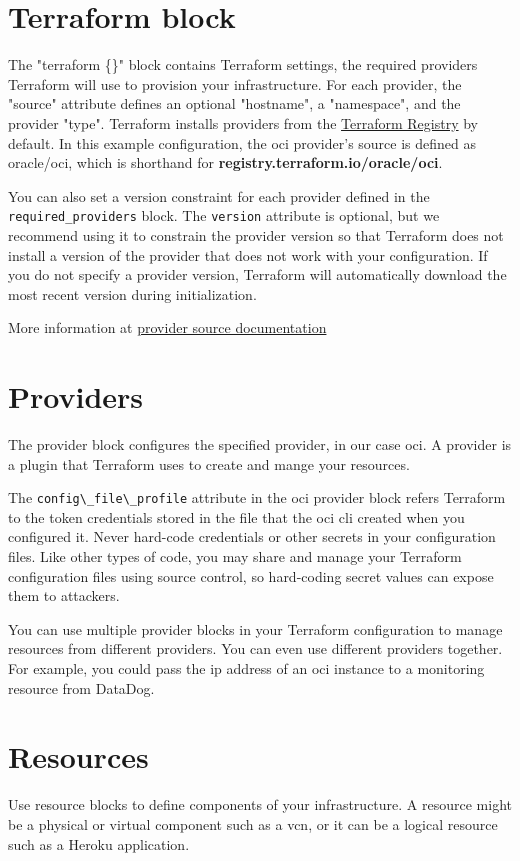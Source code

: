 \documentclass[../main.tex]{subfiles}
\begin{document}
\section{Terraform block}
The "terraform \{\}" block contains Terraform settings, the required providers Terraform will use to provision your infrastructure.
For each provider, the "source" attribute defines an optional "hostname", a "namespace", and the provider "type". Terraform installs providers from the \href{https://registry.terraform.io}{Terraform Registry} by default. 
In this example configuration, the oci provider's source is defined as oracle/oci, which is shorthand for \textbf{registry.terraform.io/oracle/oci}.

You can also set a version constraint for each provider defined in the \lstinline{required_providers} block.
The \lstinline{version} attribute is optional, but we recommend using it to constrain the provider version so that Terraform does not install a version of the provider that does not work with your configuration. 
If you do not specify a provider version, Terraform will automatically download the most recent version during initialization.

More information at \href{https://developer.hashicorp.com/terraform/language/providers/requirements}{provider source documentation}


\section{Providers}
The provider block configures the specified provider, in our case oci. A provider is a plugin that Terraform uses to create and mange your resources.

The \lstinline{config\_file\_profile} attribute in the \acrshort{oci} provider block refers Terraform to the token credentials stored in the file that the \acrshort{oci} \acrshort{cli} created when you configured it. Never hard-code credentials or other secrets in your configuration files. Like other types of code, you may share and manage your Terraform configuration files using source control, so hard-coding secret values can expose them to attackers.

You can use multiple provider blocks in your Terraform configuration to manage resources from different providers. You can even use different providers together. For example, you could pass the \acrfull{ip} address of an \acrshort{oci} instance to a monitoring resource from DataDog.

\section{Resources}
Use resource blocks to define components of your infrastructure. A resource might be a physical or virtual component such as a \acrshort{vcn}, or it can be a logical resource such as a Heroku application.
\end{document}
